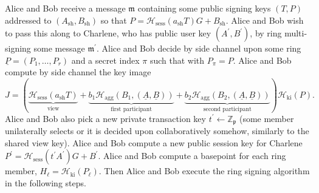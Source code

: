 \documentclass{iacrtrans}
\theoremstyle{definition}
\numberwithin{theorem}{subsection}
\numberwithin{lemma}{theorem}
\newcommand{\scalarField}{\mathbb{Z}_{\mathfrak{p}}}
\newcommand{\m}{\mathfrak{m}}
\begin{document}
Alice and Bob receive a message $\m$ containing some public signing keys $(T,P)$ addressed to $(A_{\text{sh}},B_{\text{sh}})$ so that $P = \mathcal{H}_{\text{sess}}(a_{\text{sh}} T)G + B_{\text{sh}}$.  Alice and Bob wish to pass this along to Charlene, who has public user key $(A^\prime, B^\prime)$, by ring multi-signing some message $\m^\prime$. Alice and Bob decide by side channel upon some ring $\underline{P} = (P_1, \ldots, P_r)$ and a secret index $\pi$ such that with $P_\pi = P$. Alice and Bob compute by side channel the key image 
\[J = \left(\underbrace{\mathcal{H}_{\text{sess}}(a_{\text{sh}} T)}_{\text{view}} + \underbrace{b_1\mathcal{H}_{\text{agg}}(B_1, (\underline{A}, \underline{B}))}_{\text{first participant}} + \underbrace{b_2\mathcal{H}_{\text{agg}}(B_2, (\underline{A}, \underline{B}))}_{\text{second participant}}\right)\mathcal{H}_{\text{ki}}(P).\] Alice and Bob also pick a new private transaction key $t^{\prime} \leftarrow \scalarField$ (some member unilaterally selects or it is decided upon collaboratively somehow, similarly to the shared view key). Alice and Bob compute a new public session key for Charlene $P^{\prime} = \mathcal{H}_{\text{sess}}(t^{\prime} A^{\prime})G + B^\prime$.  Alice and Bob compute a basepoint for each ring member, $H_\ell = \mathcal{H}_{\text{ki}}(P_\ell)$. Then Alice and Bob execute the ring signing algorithm in the following steps.
\end{document}
